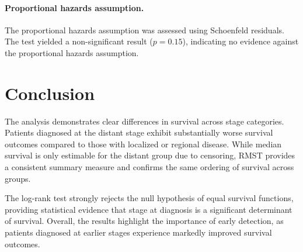 \documentclass[12pt]{article}
\begin{document}
\paragraph{Proportional hazards assumption.}
The proportional hazards assumption was assessed using Schoenfeld residuals. The test yielded a non-significant result ($p = 0.15$), indicating no evidence against the proportional hazards assumption.
\section*{Conclusion}

The analysis demonstrates clear differences in survival across stage categories. Patients diagnosed at the distant stage exhibit substantially worse survival outcomes compared to those with localized or regional disease. While median survival is only estimable for the distant group due to censoring, RMST provides a consistent summary measure and confirms the same ordering of survival across groups.

The log-rank test strongly rejects the null hypothesis of equal survival functions, providing statistical evidence that stage at diagnosis is a significant determinant of survival. Overall, the results highlight the importance of early detection, as patients diagnosed at earlier stages experience markedly improved survival outcomes.
\end{document}

